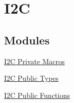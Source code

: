 \hypertarget{group___i2_c}{\section{\-I2\-C}
\label{group___i2_c}
}
\subsection*{\-Modules}
\begin{DoxyCompactItemize}
\item 
\hyperlink{group___i2_c___private___macros}{\-I2\-C Private Macros}
\item 
\hyperlink{group___i2_c___public___types}{\-I2\-C Public Types}
\item 
\hyperlink{group___i2_c___public___functions}{\-I2\-C Public Functions}
\end{DoxyCompactItemize}
